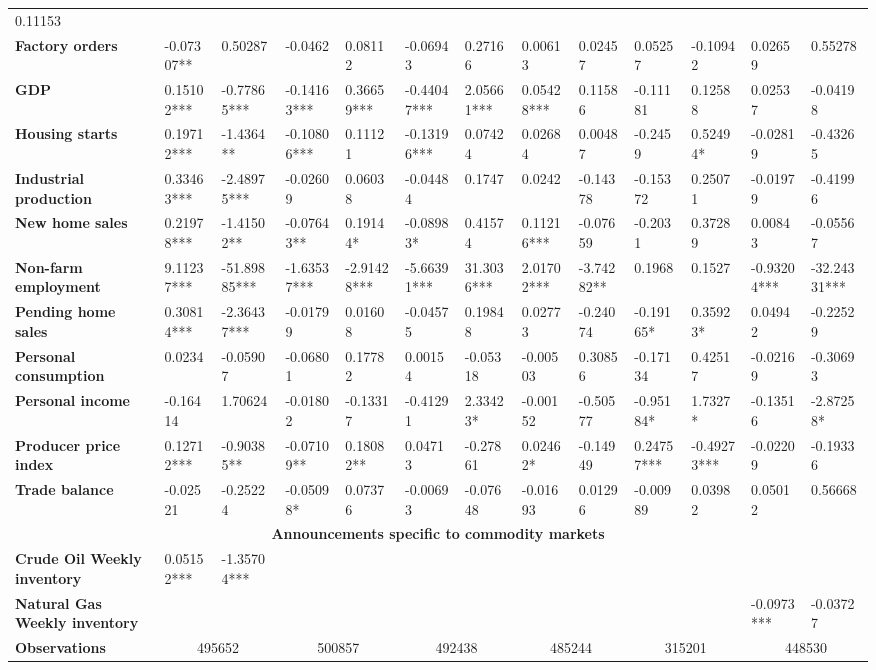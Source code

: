 \begin{sidewaystable}
{\begin{tabular}{@{}lllllllllllll@{}}
0.11153 \\ \textbf{Factory orders}& -0.07307** & 0.50287 & -0.0462 & 0.08112 & -0.06943 & 0.27166 & 0.00613 & 0.02457 & 0.05257 & -0.10942 & 0.02659 & 0.55278 \\ \textbf{GDP}& 0.15102*** & -0.77865*** & -0.14163*** & 0.36659*** & -0.44047*** & 2.05661*** & 0.05428*** & 0.11586 & -0.11181 & 0.12588 & 0.02537 & -0.04198 \\ \textbf{Housing starts}& 0.19712*** & -1.4364** & -0.10806*** & 0.11121 & -0.13196*** & 0.07424 & 0.02684 & 0.00487 & -0.2459 & 0.52494* & -0.02819 & -0.43265 \\ \textbf{Industrial production}& 0.33463*** & -2.48975*** & -0.02609 & 0.06038 & -0.04484 & 0.1747 & 0.0242 & -0.14378 & -0.15372 & 0.25071 & -0.01979 & -0.41996 \\ \textbf{New home sales}& 0.21978*** & -1.41502** & -0.07643** & 0.19144* & -0.08983* & 0.41574 & 0.11216*** & -0.07659 & -0.2031 & 0.37289 & 0.00843 & -0.05567 \\ \textbf{Non-farm employment}& 9.11237*** & -51.89885*** & -1.63537*** & -2.91428*** & -5.66391*** & 31.3036*** & 2.01702*** & -3.74282** & 0.1968 & 0.1527 & -0.93204*** & -32.24331*** \\ \textbf{Pending home sales}& 0.30814*** & -2.36437*** & -0.01799 & 0.01608 & -0.04575 & 0.19848 & 0.02773 & -0.24074 & -0.19165* & 0.35923* & 0.04942 & -0.22529 \\ \textbf{Personal consumption}& 0.0234 & -0.05907 & -0.06801 & 0.17782 & 0.00154 & -0.05318 & -0.00503 & 0.30856 & -0.17134 & 0.42517 & -0.02169 & -0.30693 \\ \textbf{Personal income}& -0.16414 & 1.70624 & -0.01802 & -0.13317 & -0.41291 & 2.33423* & -0.00152 & -0.50577 & -0.95184* & 1.7327* & -0.13516 & -2.87258* \\ \textbf{Producer price index}& 0.12712*** & -0.90385** & -0.07109** & 0.18082** & 0.04713 & -0.27861 & 0.02462* & -0.14949 & 0.24757*** & -0.49273*** & -0.02209 & -0.19336 \\ \textbf{Trade balance}& -0.02521 & -0.25224 & -0.05098* & 0.07376 & -0.00693 & -0.07648 & -0.01693 & 0.01296 & -0.00989 & 0.03982 & 0.05012 & 0.56668 \\  \midrule \multicolumn{13}{c}{\textbf{Announcements specific to commodity markets}} \\ \midrule \textbf{Crude Oil Weekly inventory}& 0.05152*** & -1.35704*** &  &  &  &  &  &  &  &  &  &  \\ \textbf{Natural Gas Weekly inventory}&  &  &  &  &  &  &  &  &  &  & -0.0973*** & -0.03727 \\  \midrule \textbf{Observations}             &\multicolumn{2}{c}{ 495652 }                                                 & \multicolumn{2}{c}{ 500857 }                                                 & \multicolumn{2}{c}{ 492438 }                                                 & \multicolumn{2}{c}{ 485244 }                                                 & \multicolumn{2}{c}{ 315201 }                                                   & \multicolumn{2}{c}{ 448530 }                                                 \\ 
\end{tabular}}
\end{sidewaystable}
